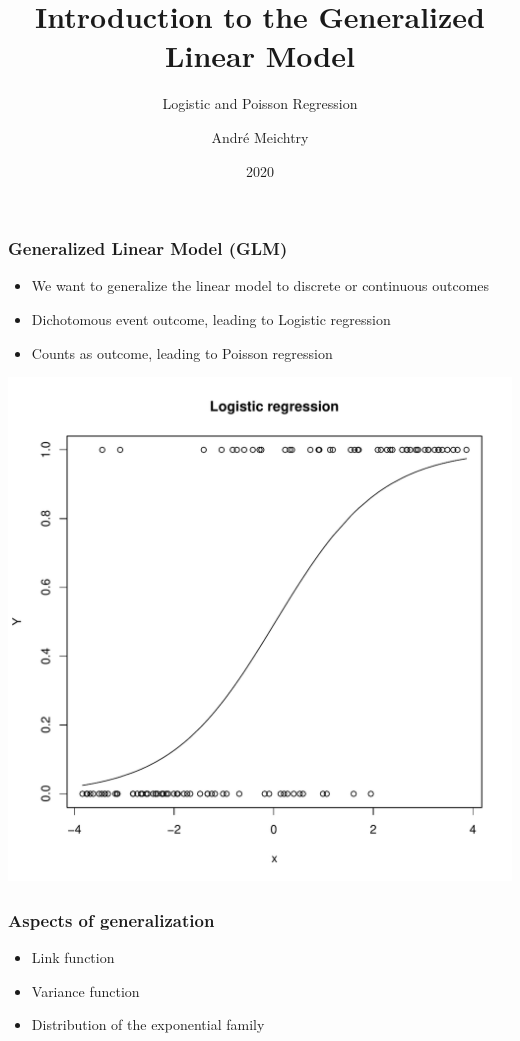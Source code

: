 \documentclass[extsize,handout,10pt]{beamer}\usepackage[]{graphicx}\usepackage[]{color}
\title{Introduction to the Generalized Linear Model}
\subtitle{Logistic and Poisson Regression}
\author{André Meichtry}
\institute{\GE \\ \ZHAWE}
\date{2020}
\newenvironment{knitrout}{}{} %
\begin{document}



\maketitle





\begin{frame}[fragile]
  \frametitle{Generalized Linear Model (GLM)}
\begin{itemize}
\item We want to generalize the linear model to discrete or continuous
  outcomes
\item Dichotomous event outcome, leading to \alert{Logistic regression}
\item Counts as outcome, leading to \alert{Poisson regression}
\end{itemize}
\begin{knitrout}\tiny
{}\color{fgcolor}

{\centering \includegraphics[width=.49\linewidth]{figures/GesWiss2unnamed-chunk-2-1} 

}



\end{knitrout}

\end{frame}


\begin{frame}
  \frametitle{Aspects of generalization}
  \begin{itemize}
  \item Link function
  \item Variance function
  \item Distribution of the exponential family
  \end{itemize}
\end{frame}
\end{document}
